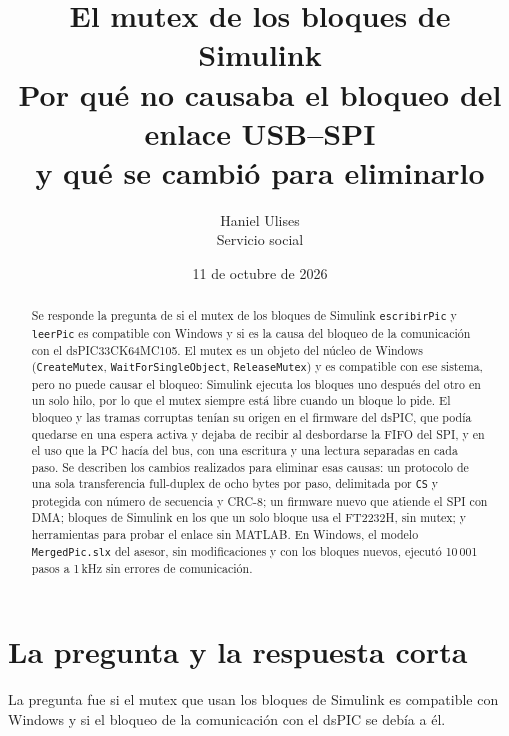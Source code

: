 \documentclass[11pt]{article}
\title{El mutex de los bloques de Simulink\\[2pt]
       \large Por qué no causaba el bloqueo del enlace USB--SPI\\
       y qué se cambió para eliminarlo}
\author{Haniel Ulises\\Servicio social}
\date{11 de octubre de 2026}
\newcommand{\code}[1]{\texttt{#1}}
\begin{document}
\maketitle

\begin{abstract}
Se responde la pregunta de si el mutex de los bloques de Simulink
\code{escribirPic} y \code{leerPic} es compatible con Windows y si es la causa
del bloqueo de la comunicación con el dsPIC33CK64MC105. El mutex es un objeto
del núcleo de Windows (\code{CreateMutex}, \code{WaitForSingleObject},
\code{ReleaseMutex}) y es compatible con ese sistema, pero no puede causar el
bloqueo: Simulink ejecuta los bloques uno después del otro en un solo hilo, por
lo que el mutex siempre está libre cuando un bloque lo pide. El bloqueo y las
tramas corruptas tenían su origen en el firmware del dsPIC, que podía quedarse
en una espera activa y dejaba de recibir al desbordarse la FIFO del SPI, y en
el uso que la PC hacía del bus, con una escritura y una lectura separadas en
cada paso. Se describen los cambios realizados para eliminar esas causas: un
protocolo de una sola transferencia full-duplex de ocho bytes por paso,
delimitada por \code{CS} y protegida con número de secuencia y CRC-8; un
firmware nuevo que atiende el SPI con DMA; bloques de Simulink en los que un
solo bloque usa el FT2232H, sin mutex; y herramientas para probar el enlace sin
MATLAB. En Windows, el modelo \code{MergedPic.slx} del asesor, sin
modificaciones y con los bloques nuevos, ejecutó 10\,001 pasos a 1\,kHz sin
errores de comunicación.
\end{abstract}

\tableofcontents
\newpage

\section{La pregunta y la respuesta corta}

La pregunta fue si el mutex que usan los bloques de Simulink es compatible con
Windows y si el bloqueo de la comunicación con el dsPIC se debía a él.
\end{document}
